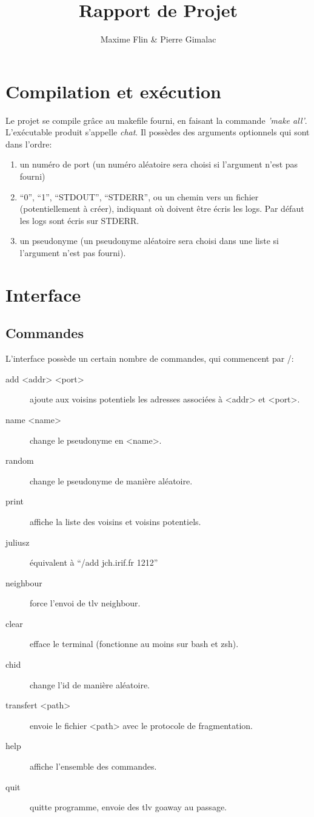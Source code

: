 \documentclass[a4paper,10pt]{article} %
\author{Maxime Flin \& Pierre Gimalac}
\title{Rapport de Projet}
\begin{document}
\maketitle

\section{Compilation et exécution}
Le projet se compile grâce au makefile fourni, en faisant la commande \textit{'make all'}.\\

L'exécutable produit s'appelle \textit{chat}. Il possèdes des arguments optionnels qui sont dans l'ordre:
\begin{enumerate}
\item un numéro de port (un numéro aléatoire sera choisi si l'argument n'est pas fourni)
\item ``0'', ``1'', ``STDOUT'', ``STDERR'', ou un chemin vers un fichier (potentiellement à créer), indiquant où doivent être écris les logs. Par défaut les logs sont écris sur STDERR.
\item un pseudonyme (un pseudonyme aléatoire sera choisi dans une liste si l'argument n'est pas fourni).
\end{enumerate}

\section{Interface}
\subsection{Commandes}
L'interface possède un certain nombre de commandes, qui commencent par /:
\begin{description}
\item[add <addr> <port>] ajoute aux voisins potentiels les adresses associées à <addr> et <port>.
\item[name <name>] change le pseudonyme en <name>.
\item[random] change le pseudonyme de manière aléatoire.
\item[print] affiche la liste des voisins et voisins potentiels.
\item[juliusz] équivalent à ``/add jch.irif.fr 1212''
\item[neighbour] force l'envoi de tlv neighbour.
\item[clear] efface le terminal (fonctionne au moins sur bash et zsh).
\item[chid] change l'id de manière aléatoire.
\item[transfert <path>] envoie le fichier <path> avec le protocole de fragmentation.
\item[help] affiche l'ensemble des commandes.
\item[quit] quitte programme, envoie des tlv goaway au passage.
\end{description}
\end{document}
